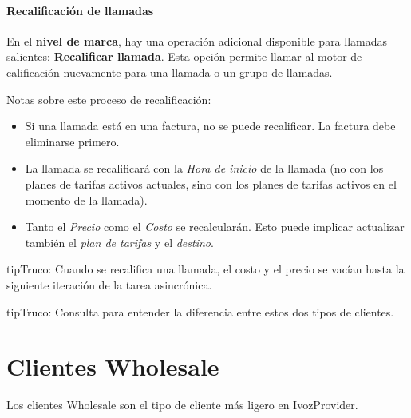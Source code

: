 \documentclass[letterpaper,10pt,spanish]{sphinxmanual}
\begin{document}
\paragraph{Recalificación de llamadas}
\label{administration_portal/client/retail/calls/call_recordings:call-rerating}
En el \textbf{nivel de marca}, hay una operación adicional disponible para llamadas salientes: \textbf{Recalificar llamada}. Esta opción permite llamar al motor de calificación nuevamente para una llamada o un grupo de llamadas.

Notas sobre este proceso de recalificación:
\begin{itemize}
\item {} 
Si una llamada está en una factura, no se puede recalificar. La factura debe eliminarse primero.

\item {} 
La llamada se recalificará con la \emph{Hora de inicio} de la llamada (no con los planes de tarifas activos actuales, sino con los planes de tarifas activos en el momento de la llamada).

\item {} 
Tanto el \emph{Precio} como el \emph{Costo} se recalcularán. Esto puede implicar actualizar también el \emph{plan de tarifas} y el \emph{destino}.

\end{itemize}

\begin{notice}{tip}{Truco:}
Cuando se recalifica una llamada, el costo y el precio se vacían hasta la siguiente iteración de la tarea asincrónica.
\end{notice}

\begin{notice}{tip}{Truco:}
Consulta {\hyperref[administration_portal/brand/clients/retail:differences\string-between\string-retail\string-and\string-residential\string-clients]{}} para entender la diferencia entre estos dos tipos de clientes.
\end{notice}
\label{administration_portal/client/wholesale/index:wholesale-clients}

\section{Clientes Wholesale}
\label{administration_portal/client/wholesale/index:clientes-wholesale}\label{administration_portal/client/wholesale/index:wholesale-clients}\label{administration_portal/client/wholesale/index::doc}\label{administration_portal/client/wholesale/index:id1}
Los clientes Wholesale son el tipo de cliente más ligero en IvozProvider.
\end{document}
